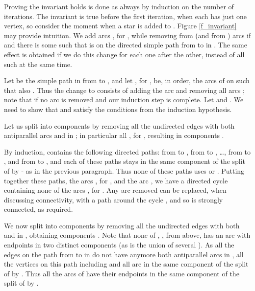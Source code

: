 \documentclass[12pt]{article}
\begin{document}
Proving the invariant holds is done as always 
by induction on the number of iterations.
The invariant is true before the first iteration, when each 
has just one vertex, so consider the moment when
a star  is added to . Figure \ref{f_invariant} 
may provide intuition.
We add arcs , for ,
while removing from  (and from  )
  arcs  if  and there is some  such that
 is on the directed simple path from  to  in .
The same effect is obtained if we do this change for 
each  one after the other,
instead of all such  at the same time.


Let  be the simple path in  from  to , and let
, for ,  
be, in order, the arcs of  on  such that also .
Thus the change to  consists of adding the arc  and
removing all arcs ; note that if  no arc is removed
and our induction step is complete. 
Let  and
.
We need to show that  and  satisfy the conditions
from the induction hypothesis.

Let us split  into components by removing all
the undirected edges  with both antiparallel arcs   and  in ; in
particular all , for ,
resulting in components .

By induction,   contains the following directed paths:
 from  to ,  from  to , \ldots, 
 from  to , and  from  to ,
and each of these paths stays in the same component  of 
the split of  by  - as in the previous paragraph.
Thus none of these paths uses  or .
Putting together these paths, the arcs , for ,
and the arc , we have a directed cycle 
containing none of the arcs  , for .
Any arc removed can be replaced, when discussing connectivity,
with a path around the cycle , and so  is strongly connected,
as required.

We now split  into components by removing all
the undirected edges  with both  and  in ,
obtaining components . Note that none of , , from above, has an arc
with endpoints in two distinct components  (as  is the union
of several ). 
As all the edges on the path from  to  in 
do not have anymore both antiparallel arcs in ,
all the vertices on this path including  and all 
are in the same component  of the split of  by .
Thus all the arcs of  have their endpoints in the
same component of the split of  by .
\end{document}
